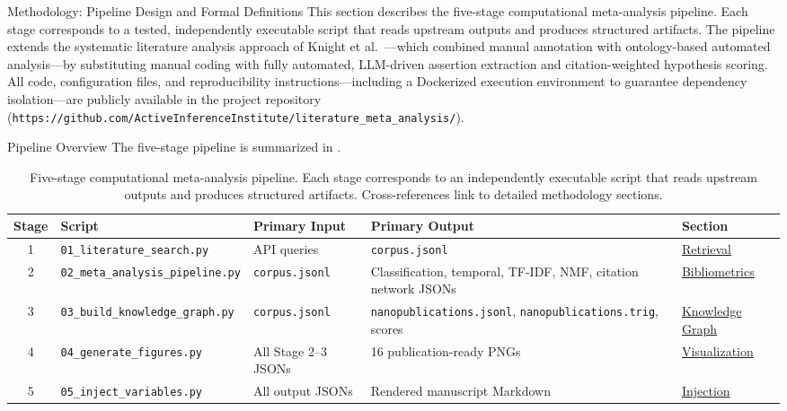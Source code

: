 \documentclass[
  ignorenonframetext,
]{beamer}
\author{\texorpdfstring{}{}}
\date{}
\begin{document}
\begin{frame}[fragile]{Methodology: Pipeline Design and Formal
Definitions \label{sec:methods}}
\protect{}\label{methodology-pipeline-design-and-formal-definitions}
This section describes the five-stage computational meta-analysis
pipeline. Each stage corresponds to a tested, independently executable
script that reads upstream outputs and produces structured artifacts.
The pipeline extends the systematic literature analysis approach of
Knight et al.~\citep{knight2022fep}---which combined manual annotation
with ontology-based automated analysis---by substituting manual coding
with fully automated, LLM-driven assertion extraction and
citation-weighted hypothesis scoring. All code, configuration files, and
reproducibility instructions---including a Dockerized execution
environment to guarantee dependency isolation---are publicly available
in the project repository
(\texttt{https://github.com/ActiveInferenceInstitute/literature\_meta\_analysis/}).

\begin{block}{Pipeline Overview}
\protect{}\label{pipeline-overview}
The five-stage pipeline is summarized in .

\begin{table}[htbp]
\centering
\caption{Five-stage computational meta-analysis pipeline. Each stage corresponds to an independently executable script that reads upstream outputs and produces structured artifacts. Cross-references link to detailed methodology sections.}
\label{tab:pipeline_stages}
\begin{tabular}{cllll}
\toprule
\textbf{Stage} & \textbf{Script} & \textbf{Primary Input} & \textbf{Primary Output} & \textbf{Section} \\
\midrule
1 & \texttt{01\_literature\_search.py} & API queries & \texttt{corpus.jsonl} & \hyperref[sec:methods_retrieval]{Retrieval} \\
2 & \texttt{02\_meta\_analysis\_pipeline.py} & \texttt{corpus.jsonl} & Classification, temporal, TF-IDF, NMF, citation network JSONs & \hyperref[sec:methods_bibliometrics]{Bibliometrics} \\
3 & \texttt{03\_build\_knowledge\_graph.py} & \texttt{corpus.jsonl} & \texttt{nanopublications.jsonl}, \texttt{nanopublications.trig}, scores & \hyperref[sec:methods_kg]{Knowledge Graph} \\
4 & \texttt{04\_generate\_figures.py} & All Stage 2--3 JSONs & 16 publication-ready PNGs & \hyperref[sec:methods_viz]{Visualization} \\
5 & \texttt{05\_inject\_variables.py} & All output JSONs & Rendered manuscript Markdown & \hyperref[sec:methods_viz]{Injection} \\
\bottomrule
\end{tabular}
\end{table}


\end{block}
\end{frame}
\end{document}
